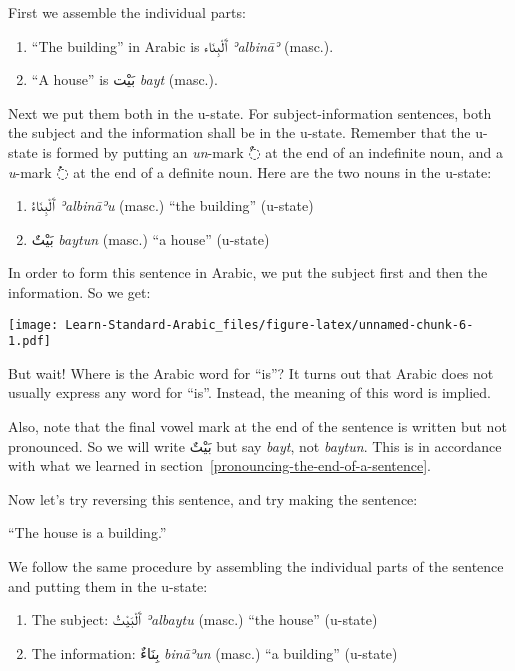 \documentclass[
  10pt,
]{book}
\providecommand{\tightlist}{%
  \setlength{\itemsep}{0pt}\setlength{\parskip}{0pt}}
\begin{document}
First we assemble the individual parts:

\begin{enumerate}
\def\labelenumi{\roman{enumi}.}
\tightlist
\item
  \enquote{The building} in Arabic is \foreignlanguage{arabic}{ٱَلْبِنَاء} \emph{ʾalbināʾ} (masc.).
\item
  \enquote{A house} is \foreignlanguage{arabic}{بَيْت} \emph{bayt} (masc.).
\end{enumerate}

Next we put them both in the u-state. For subject-information sentences, both the subject and the information shall be in the u-state. Remember that the u-state is formed by putting an \emph{un}-mark \foreignlanguage{arabic}{◌ٌ} at the end of an indefinite noun, and a \emph{u}-mark \foreignlanguage{arabic}{◌ُ} at the end of a definite noun. Here are the two nouns in the u-state:

\begin{enumerate}
\def\labelenumi{\roman{enumi}.}
\tightlist
\item
  \foreignlanguage{arabic}{ٱَلْبِنَاءُ} \emph{ʾalbināʾu} (masc.) \enquote{the building} (u-state)
\item
  \foreignlanguage{arabic}{بَيْتٌ} \emph{baytun} (masc.) \enquote{a house} (u-state)
\end{enumerate}

In order to form this sentence in Arabic, we put the subject first and then the information. So we get:

\texttt{[image: Learn-Standard-Arabic\_files/figure-latex/unnamed-chunk-6-1.pdf]}

But wait! Where is the Arabic word for \enquote{is}? It turns out that Arabic does not usually express any word for \enquote{is}. Instead, the meaning of this word is implied.

Also, note that the final vowel mark at the end of the sentence is written but not pronounced. So we will write
\foreignlanguage{arabic}{بَيْتٌ} but say
\emph{bayt}, not
\emph{baytun}.
This is in accordance with what we learned in section~\ref{pronouncing-the-end-of-a-sentence}.

Now let's try reversing this sentence, and try making the sentence:

\enquote{The house is a building.}

We follow the same procedure by assembling the individual parts of the sentence and putting them in the u-state:

\begin{enumerate}
\def\labelenumi{\roman{enumi}.}
\tightlist
\item
  The subject: \foreignlanguage{arabic}{ٱَلْبَيْتُ} \emph{ʾalbaytu} (masc.) \enquote{the house} (u-state)
\item
  The information: \foreignlanguage{arabic}{بِنَاءٌ} \emph{bināʾun} (masc.) \enquote{a building} (u-state)
\end{enumerate}
\end{document}
